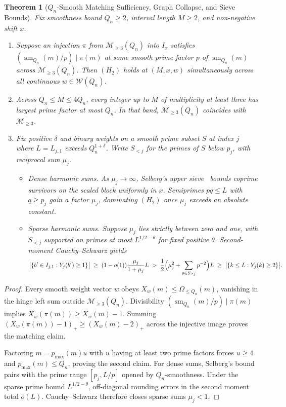 \documentclass[11pt]{article}
\newtheorem{theorem}{Theorem}
\DeclareMathOperator{\sm}{sm}
\begin{document}
\begin{theorem}[$Q_n$-Smooth Matching Sufficiency, Graph Collapse, and Sieve Bounds]
\label{thm:smooth}
Fix smoothness bound $Q_n \ge 2$, interval length $M \ge 2$, and non-negative shift $x$.
\begin{enumerate}
\item Suppose an injection $\pi$ from $\mathcal{M}_{\ge 3}(Q_n)$ into $I_x$ satisfies $(\sm_{Q_n}(m) / p) \mid \pi(m)$ at some smooth prime factor $p$ of $\sm_{Q_n}(m)$ across $\mathcal{M}_{\ge 3}(Q_n)$. Then $(H_2)$ holds at $(M, x, w)$ simultaneously across all continuous $w \in \mathcal{W}(Q_n)$.
\item Across $Q_n \le M \le 4 Q_n$, every integer up to $M$ of multiplicity at least three has largest prime factor at most $Q_n$. In that band, $\mathcal{M}_{\ge 3}(Q_n)$ coincides with $\mathcal{M}_{\ge 3}$.
\item Fix positive $\delta$ and binary weights on a smooth prime subset $S$ at index $j$ where $L = L_{j, 1}$ exceeds $Q_n^{1 + \delta}$. Write $S_{< j}$ for the primes of $S$ below $p_j$, with reciprocal sum $\mu_j$.
\begin{itemize}
\item \emph{Dense harmonic sums.} As $\mu_j \to \infty$, Selberg's upper sieve~\cite{halberstamrichert74} bounds coprime survivors on the scaled block uniformly in $x$. Semiprimes $p q \le L$ with $q \ge p_j$ gain a factor $\mu_j$, dominating $(H_2)$ once $\mu_j$ exceeds an absolute constant.
\item \emph{Sparse harmonic sums.} Suppose $\mu_j$ lies strictly between zero and one, with $S_{< j}$ supported on primes at most $L^{1 / 2 - \theta}$ for fixed positive $\theta$. Second-moment Cauchy--Schwarz yields
\[
\bigl|\{b' \in I_{j, 1} : Y_j(b') \ge 1\}\bigr| \;\ge\; (1 - o(1)) \frac{\mu_j}{1 + \mu_j} L \;>\; \frac{1}{2}\Bigl(\mu_j^2 + \sum_{p \in S_{< j}} p^{-2}\Bigr) L \;\ge\; \bigl|\{k \le L : Y_j(k) \ge 2\}\bigr|.
\]
\end{itemize}
\end{enumerate}
\end{theorem}
\begin{proof}
Every smooth weight vector $w$ obeys $X_w(m) \le \Omega_{\le Q_n}(m)$, vanishing in the hinge left sum outside $\mathcal{M}_{\ge 3}(Q_n)$. Divisibility $(\sm_{Q_n}(m) / p) \mid \pi(m)$ implies $X_w(\pi(m)) \ge X_w(m) - 1$. Summing $(X_w(\pi(m)) - 1)_+ \ge (X_w(m) - 2)_+$ across the injective image proves the matching claim.

Factoring $m = p_{\max}(m) u$ with $u$ having at least two prime factors forces $u \ge 4$ and $p_{\max}(m) \le Q_n$, proving the second claim. For dense sums, Selberg's bound pairs with the prime range $[p_j, L / p]$ opened by $Q_n$-smoothness. Under the sparse prime bound $L^{1 / 2 - \theta}$, off-diagonal rounding errors in the second moment total $o(L)$. Cauchy--Schwarz therefore closes sparse sums $\mu_j < 1$.
\end{proof}
\end{document}

